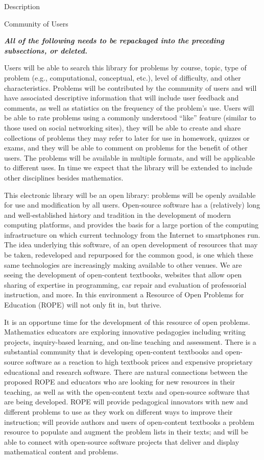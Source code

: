 \documentclass[11pt]{article}
\begin{document}
\begin{section}{Description}
\begin{subsection}{Community of Users}
\end{subsection}

\textbf{\textit{All of the following needs to be repackaged into the
    preceding subsections, or deleted.}}

Users will be able to search this library
for problems by course, topic, type of problem (e.g., computational,
conceptual, etc.), level of difficulty, and other characteristics.
Problems will be contributed by the community of users and will have
associated descriptive information that will include user feedback and
comments, as well as statistics on the frequency of the problem's use.
Users will be able to rate problems using a commonly understood ``like''
feature (similar to those used on social networking sites), they will be
able to create and share collections of problems they may refer to later
for use in homework, quizzes or exams, and they will be able to comment on
problems for the benefit of other users.  The problems will be available
in multiple formats, and will be applicable to different uses.  In time we
expect that the library will be extended to include other disciplines
besides mathematics.

This electronic library will be an open library: problems will be openly
available for use and modification by all users.  Open-source software has
a (relatively) long and well-established history and tradition in the
development of modern computing platforms, and provides the basis for a
large portion of the computing infrastructure on which current technology
from the Internet to smartphones run.  The idea underlying this software,
of an open development of resources that may be taken, redeveloped and
repurposed for the common good, is one which these same technologies are
increasingly making available to other venues. We are seeing the
development of open-content textbooks, websites that allow open sharing of
expertise in programming, car repair and evaluation of professorial
instruction, and more.  In this environment a Resource of Open Problems for Education (ROPE) will
not only fit in, but thrive.

It is an opportune time for the development of this resource of open problems.  Mathematics educators are exploring innovative pedagogies
including writing projects, inquiry-based learning, and on-line teaching
and assessment.  There is a substantial community that is developing
open-content textbooks and open-source software as a reaction to high
textbook prices and expensive proprietary educational and research
software.  There are natural connections between the proposed ROPE and
educators who are looking for new resources in their teaching, as well as
with the open-content texts and open-source software that are being
developed.  ROPE will provide pedagogical innovators with new and
different problems to use as they work on different ways to improve their
instruction; will provide authors and users of open-content textbooks a
problem resource to populate and augment the problem lists in their texts;
and will be able to connect with open-source software projects that
deliver and display mathematical content and problems.


\end{section}
\end{document}
